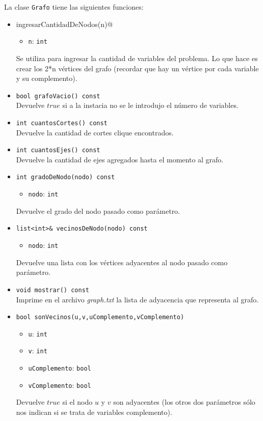 La clase \verb_Grafo_ tiene las siguientes funciones:

\begin{itemize}
\item \verb@void ingresarCantidadDeNodos(n)@ 
	\begin{itemize}
	\item \verb_n_: \verb_int_
	\end{itemize}
Se utiliza para ingresar la cantidad de variables del problema. Lo que hace es crear los 2*n v\'ertices del grafo (recordar que hay un v\'ertice por cada variable y su complemento).

\item \verb_bool grafoVacio() const_\\
Devuelve $true$ si a la instacia no se le introdujo el n\'umero de variables.

\item \verb_int cuantosCortes() const_\\
Devuelve la cantidad de cortes clique encontrados.

\item \verb_int cuantosEjes() const_\\
Devuelve la cantidad de ejes agregados hasta el momento al grafo.

\item \verb_int gradoDeNodo(nodo) const_
	\begin{itemize}
	\item \verb_nodo_: \verb_int_
	\end{itemize}
Devuelve el grado del nodo pasado como par\'ametro.

\item \verb_list<int>& vecinosDeNodo(nodo) const_
	\begin{itemize}
	\item \verb_nodo_: \verb_int_
	\end{itemize}
Devuelve una lista con los v\'ertices adyacentes al nodo pasado como par\'ametro.

\item \verb_void mostrar() const_\\
Imprime en el archivo \textit{graph.txt} la lista de adyacencia que representa al grafo.

\item \verb_bool sonVecinos(u,v,uComplemento,vComplemento)_
	\begin{itemize}
	\item \verb_u_: \verb_int_
	\item \verb_v_: \verb_int_
	\item \verb_uComplemento_: \verb_bool_
	\item \verb_vComplemento_: \verb_bool_
	\end{itemize}
Devuelve $true$ si el nodo $u$ y $v$ son adyacentes (los otros dos par\'ametros s\'olo nos indican si se trata de variables complemento).


\end{itemize}
